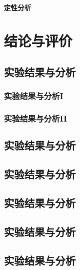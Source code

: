 \documentclass{USTBBook}
\begin{document}
\subsection{定性分析}
\zhlipsum[17]

\part{结论与评价}
\ToggleSectionStyle

\chapter{实验结果与分析}
\section{实验结果与分析I}
\zhlipsum[14]

\section{实验结果与分析II}
\zhlipsum[14]

\chapter{实验结果与分析}
\zhlipsum[14]

\chapter{实验结果与分析}
\zhlipsum[14]

\chapter{实验结果与分析}
\zhlipsum[14]

\chapter{实验结果与分析}
\zhlipsum[14]

\chapter{实验结果与分析}
\zhlipsum[14]

\backmatter
\end{document}
